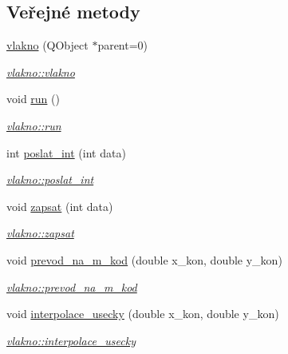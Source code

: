 \subsection*{Veřejné metody}
\begin{DoxyCompactItemize}
\item 
\hyperlink{classvlakno_a102c887fab360691a40c3ab39fc4f07c}{vlakno} (Q\+Object $\ast$parent=0)
\begin{DoxyCompactList}\small\item\em \hyperlink{classvlakno_a102c887fab360691a40c3ab39fc4f07c}{vlakno\+::vlakno} \end{DoxyCompactList}\item 
void \hyperlink{classvlakno_ab7d88058b2c59385ff62a1f614afdbc1}{run} ()
\begin{DoxyCompactList}\small\item\em \hyperlink{classvlakno_ab7d88058b2c59385ff62a1f614afdbc1}{vlakno\+::run} \end{DoxyCompactList}\item 
int \hyperlink{classvlakno_aee3ebe4032780ee3e04f4d96869a1647}{poslat\+\_\+int} (int data)
\begin{DoxyCompactList}\small\item\em \hyperlink{classvlakno_aee3ebe4032780ee3e04f4d96869a1647}{vlakno\+::poslat\+\_\+int} \end{DoxyCompactList}\item 
void \hyperlink{classvlakno_ab8e99f38af287397d9ef196a15e3e9e2}{zapsat} (int data)
\begin{DoxyCompactList}\small\item\em \hyperlink{classvlakno_ab8e99f38af287397d9ef196a15e3e9e2}{vlakno\+::zapsat} \end{DoxyCompactList}\item 
void \hyperlink{classvlakno_aae7c7820202225a714d844e8e8f866d7}{prevod\+\_\+na\+\_\+m\+\_\+kod} (double x\+\_\+kon, double y\+\_\+kon)
\begin{DoxyCompactList}\small\item\em \hyperlink{classvlakno_aae7c7820202225a714d844e8e8f866d7}{vlakno\+::prevod\+\_\+na\+\_\+m\+\_\+kod} \end{DoxyCompactList}\item 
void \hyperlink{classvlakno_a396bdebeea2156b4fd7509e6dd19dde8}{interpolace\+\_\+usecky} (double x\+\_\+kon, double y\+\_\+kon)
\begin{DoxyCompactList}\small\item\em \hyperlink{classvlakno_a396bdebeea2156b4fd7509e6dd19dde8}{vlakno\+::interpolace\+\_\+usecky} \end{DoxyCompactList}\item 

\end{DoxyCompactItemize}
